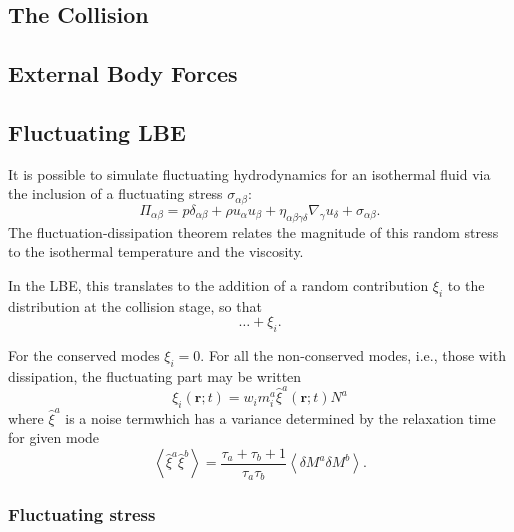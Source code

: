 \subsection{The Collision}

\subsection{External Body Forces}

\subsection{Fluctuating LBE}

It is possible \cite{adhikari2005} to simulate fluctuating
hydrodynamics for an isothermal fluid via the inclusion of
a fluctuating stress $\sigma_{\alpha\beta}$:
\begin{equation}
\Pi_{\alpha\beta} = p\delta_{\alpha\beta} + \rho u_\alpha u_\beta
+ \eta_{\alpha\beta\gamma\delta} \nabla_\gamma u_\delta + \sigma_{\alpha\beta}.
\end{equation}
The fluctuation-dissipation theorem relates the magnitude of this
random stress to the isothermal temperature and the viscosity.

In the LBE, this translates to the addition of a random contribution
$\xi_i$ to the distribution at the collision stage, so that
\begin{equation}
\ldots + \xi_i.
\end{equation}

For the conserved modes $\xi_i = 0$. For all the non-conserved modes,
i.e., those with dissipation, the fluctuating part may be written
\begin{equation}
\xi_i (\mathbf{r}; t) = w_i m_i^a \hat{\xi}^a (\mathbf{r}; t) N^a
\end{equation}
where $\hat{\xi}^a$ is a noise termwhich has a variance determined
by the relaxation time for given mode
\begin{equation}
\left< \hat{\xi}^a \hat{\xi}^b \right> =
\frac{\tau_a + \tau_b + 1}{\tau_a \tau_b}
\left< \delta M^a \delta M^b \right>.
\label{eq_fvar}
\end{equation}

\subsubsection{Fluctuating stress}

